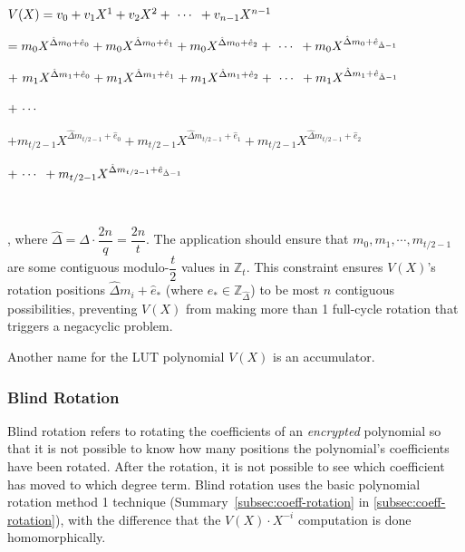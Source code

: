 \begin{tcolorbox}[title={\textbf{\tboxlabel{\ref*{subsec:tfhe-zero-padding}} Structure of Lookup Table Polynomial $\bm{V(X)}$}}]

$ $

$V(X) = v_0 + v_1X^1 + v_2X^2 + \text{ } \text{$\cdots$} \text{ } + v_{n-1}X^{n-1}$

\text{ } $= m_0X^{\hat{\Delta} m_0 + \hat{e}_0} + m_0X^{\hat{\Delta} m_0 + \hat{e}_1} + m_0X^{\hat{\Delta} m_0 + \hat{e}_2} + \text{ } \text{$\cdots$} \text{ } + m_0X^{\hat{\Delta} m_0 + \hat{e}_{\hat{\Delta} - 1}}$

\text{ } $ + \text{ } m_1X^{\hat{\Delta} m_1 + \hat{e}_0} + m_1X^{\hat{\Delta} m_1 + \hat{e}_1} + m_1X^{\hat{\Delta} m_1 + \hat{e}_2} + \text{ } \text{$\cdots$} \text{ } + m_1X^{\hat{\Delta} m_1 + \hat{e}_{\hat{\Delta} - 1}}$

\text{ } $ + \text{ } \text{$\cdots$} \text{ } $

\text{ } $ + m_{{t}/{2} - 1}X^{\hat{\Delta} m_{{t}/{2} - 1} + \hat{e}_0} + m_{{t}/{2} - 1}X^{\hat{\Delta} m_{{t}/{2} - 1} + \hat{e}_1} + m_{{t}/{2} - 1}X^{\hat{\Delta} m_{{t}/{2} - 1} + \hat{e}_2}$

\text{ } \text{ } $ + \text{ } \text{$\cdots$} \text{ } + m_{{t}/{2} - 1}X^{\hat{\Delta} m_{{t}/{2} - 1} + \hat{e}_{\hat{\Delta} - 1}}$

$ $

\noindent , where $\hat\Delta = \Delta \cdot \dfrac{2n}{q} = \dfrac{2n}{t}$. The application should ensure that $m_0, m_1, \cdots, m_{t/2 - 1}$ are some contiguous modulo-$\dfrac{t}{2}$ values in $\mathbb{Z}_t$. This constraint ensures $V(X)$'s rotation positions $\hat{\Delta} m_i + \hat {e}_{*}$ (where $e_* \in \mathbb{Z}_{\hat{\Delta}}$) to be most $n$ contiguous possibilities, preventing $V(X)$ from making more than 1 full-cycle rotation that triggers a negacyclic problem. 


\end{tcolorbox}

Another name for the LUT polynomial $V(X)$ is an accumulator.

\subsubsection{Blind Rotation}
\label{subsec:bootstrapping-blind-rotation} 

Blind rotation refers to rotating the coefficients of an \textit{encrypted} polynomial so that it is not possible to know how many positions the polynomial's coefficients have been rotated. After the rotation, it is not possible to see which coefficient has moved to which degree term. Blind rotation uses the basic polynomial rotation method 1 technique (Summary~\ref*{subsec:coeff-rotation} in \autoref{subsec:coeff-rotation}), with the difference that the $V(X)\cdot X^{-i}$ computation is done homomorphically. 


